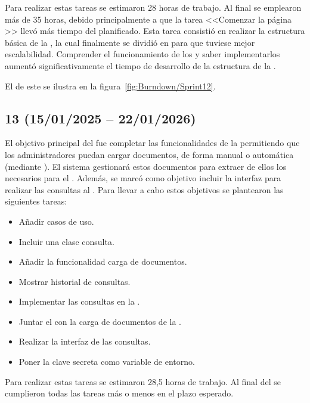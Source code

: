 Para realizar estas tareas se estimaron 28 horas de trabajo. Al final se emplearon más de 35 horas, debido principalmente a que la tarea <<Comenzar la página >> llevó más tiempo del planificado. Esta tarea consistió en realizar la estructura básica de la , la cual finalmente  se dividió en  para que tuviese mejor escalabilidad. Comprender el funcionamiento de los  y saber implementarlos aumentó significativamente el tiempo de desarrollo de la estructura de la .

El  de este  se ilustra en la figura~\ref{fig:Burndown/Sprint12}.

\subsection{ 13 (15/01/2025 -- 22/01/2026)}
El objetivo principal del  fue completar las funcionalidades de la  permitiendo que los administradores puedan cargar documentos, de forma manual o automática (mediante ). El sistema gestionará estos documentos para extraer de ellos los  necesarios para el . Además, se marcó como objetivo incluir la interfaz para realizar las consultas al . Para llevar a cabo estos objetivos se plantearon las siguientes tareas:
\begin{itemize}
\tightlist
	\item Añadir casos de uso.
	\item Incluir una clase consulta.
	\item Añadir la funcionalidad carga de documentos.
	\item Mostrar historial de consultas.
	\item Implementar las consultas en la .
	\item Juntar el  con la carga de documentos de la .
	\item Realizar la interfaz de las consultas.
	\item Poner la clave secreta como variable de entorno.
\end{itemize}

Para realizar estas tareas se estimaron 28,5 horas de trabajo. Al final del  se cumplieron todas las tareas más o menos en el plazo esperado.

